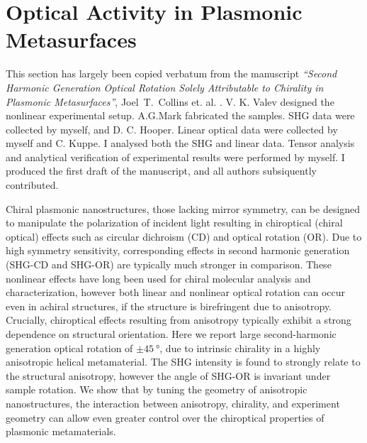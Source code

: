 \chapter{Optical Activity in Plasmonic Metasurfaces}\label{sec:results:OAinPlanarNanohelices}

This section has largely been copied verbatum from the manuscript \textit{``Second Harmonic Generation Optical Rotation Solely Attributable to Chirality in Plasmonic Metasurfaces''}, Joel~T.~Collins et. al. \cite{Collins2018b}.
V. K. Valev designed the nonlinear experimental setup. A.G.Mark fabricated the samples. SHG data were collected by myself, and D. C. Hooper. Linear optical data were collected by myself and C. Kuppe. I analysed both the SHG and linear data. Tensor analysis and analytical verification of experimental results were performed by myself. I produced the first draft of the manuscript, and all authors subsiquently contributed.

\bigskip \noindent
Chiral plasmonic nanostructures, those lacking mirror symmetry, can be designed to manipulate the polarization of incident light resulting in chiroptical (chiral optical) effects such as circular dichroism (CD) and optical rotation (OR). Due to high symmetry sensitivity, corresponding effects in second harmonic generation (SHG-CD and SHG-OR) are typically much stronger in comparison. These nonlinear effects have long been used for chiral molecular analysis and characterization, however both linear and nonlinear optical rotation can occur even in achiral structures, if the structure is birefringent due to anisotropy. Crucially, chiroptical effects resulting from anisotropy typically exhibit a strong dependence on structural orientation. Here we report large second-harmonic generation optical rotation of $\pm\SI{45}{\degree}$, due to intrinsic chirality in a highly anisotropic helical metamaterial. The SHG intensity is found to strongly relate to the structural anisotropy, however the angle of SHG-OR is invariant under sample rotation. We show that by tuning the geometry of anisotropic nanostructures, the interaction between anisotropy, chirality, and experiment geometry can allow even greater control over the chiroptical properties of plasmonic metamaterials.

